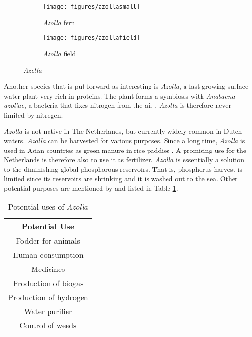 \documentclass[a4paper,12pt]{scrbook}
\begin{document}
\begin{figure}
    \centering
    \begin{subfigure}[a]{0.3\textwidth}
    	\texttt{[image: figures/azollasmall]} 
    	\caption{ \textit{Azolla} fern}
    	\label{fig:azollasmall}
    \end{subfigure}	
    \quad
    \begin{subfigure}[a]{0.3\textwidth}
    	\texttt{[image: figures/azollafield]} 
    	\caption{ \textit{Azolla} field}
    	\label{fig:azollafield}
    \end{subfigure}	
    \caption{ \textit{Azolla} \citep{wagner1997azolla}}
    \label{fig:azolla}
\end{figure}

Another species that is put forward as interesting is \textit{Azolla}, a fast growing surface water plant very rich in proteins. The plant forms a symbiosis with \textit{Anabaena azollae}, a bacteria that fixes nitrogen from the air \citep{wagner1997azolla}. \textit{Azolla} is therefore never limited by nitrogen. 

\textit{Azolla} is not native in The Netherlands, but currently widely common in Dutch waters. \textit{Azolla} can be harvested for various purposes. Since a long time, \textit{Azolla} is used in Asian countries as green manure in rice paddies \citep{wagner1997azolla}. A promising use for the Netherlands is therefore also to use it as fertilizer. \textit{Azolla} is essentially a solution to the diminishing global phosphorous reservoirs. That is, phosphorus harvest is limited since its reservoirs are shrinking and it is washed out to the sea. Other potential purposes are mentioned by \citet{wagner1997azolla} and listed in Table \ref{tab:azolla}.

\begin{table}
\centering
\caption{Potential uses of \textit{Azolla}}
\begin{tabular}{|c|}
\hline 
\textbf{Potential Use} \\ 
\hline 
Fodder for animals \\ 
\hline 
Human consumption \\ 
\hline 
Medicines \\ 
\hline 
Production of biogas \\ 
\hline 
Production of hydrogen \\ 
\hline 
Water purifier \\ 
\hline 
Control of weeds \\ 
\hline 
\end{tabular} 
\label{tab:azolla}
\end{table}
\end{document}
